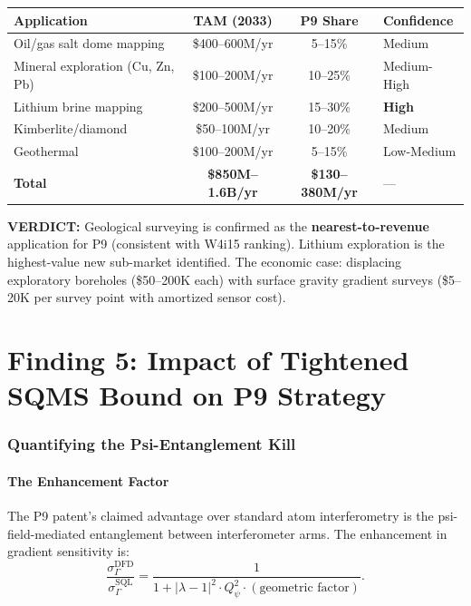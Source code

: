 \documentclass[11pt]{article}
\theoremstyle{definition}
\theoremstyle{remark}
\newcommand{\verdict}[1]{\textcolor{green!50!black}{\textbf{VERDICT:} #1}}
\begin{document}
\begin{center}
\begin{tabular}{lccl}
\toprule
\textbf{Application} & \textbf{TAM (2033)} & \textbf{P9 Share} & \textbf{Confidence} \\
\midrule
Oil/gas salt dome mapping & \$400--600M/yr & 5--15\% & Medium \\
Mineral exploration (Cu, Zn, Pb) & \$100--200M/yr & 10--25\% & Medium-High \\
Lithium brine mapping & \$200--500M/yr & 15--30\% & \textbf{High} \\
Kimberlite/diamond & \$50--100M/yr & 10--20\% & Medium \\
Geothermal & \$100--200M/yr & 5--15\% & Low-Medium \\
\textbf{Total} & \textbf{\$850M--1.6B/yr} & \textbf{\$130--380M/yr} & --- \\
\bottomrule
\end{tabular}
\end{center}

\verdict{Geological surveying is confirmed as the \textbf{nearest-to-revenue}
application for P9 (consistent with W4i15 ranking). Lithium exploration is
the highest-value new sub-market identified. The economic case: displacing
exploratory boreholes (\$50--200K each) with surface gravity gradient surveys
(\$5--20K per survey point with amortized sensor cost).}

\part{Finding 5: Impact of Tightened SQMS Bound on P9 Strategy}
\label{part:bound-impact}

\section{Quantifying the Psi-Entanglement Kill}
\label{sec:kill}

\subsection{The Enhancement Factor}

The P9 patent's claimed advantage over standard atom interferometry is
the psi-field-mediated entanglement between interferometer arms. The
enhancement in gradient sensitivity is:
\begin{equation}
  \frac{\sigma_\Gamma^{\text{DFD}}}{\sigma_\Gamma^{\text{SQL}}}
  = \frac{1}{1 + |\lambda - 1|^2 \cdot Q_{\psi}^2 \cdot (\text{geometric factor})}.
\end{equation}
\end{document}
